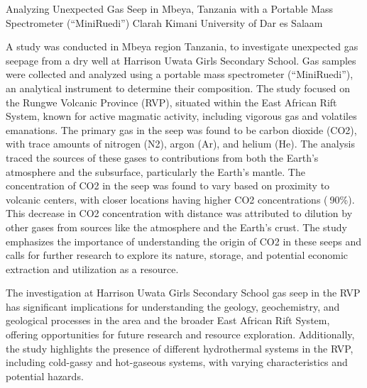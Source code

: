 \begin{conf-abstract}
{Analyzing Unexpected Gas Seep in Mbeya, Tanzania with a Portable Mass Spectrometer (“MiniRuedi”)}
{Clarah Kimani}
{University of Dar es Salaam}
{A study was conducted in Mbeya region Tanzania, to investigate unexpected gas seepage from a dry well at Harrison Uwata Girls Secondary School. Gas samples were collected and analyzed using a portable mass spectrometer (“MiniRuedi”), an analytical instrument to determine their composition. The study focused on the Rungwe Volcanic Province (RVP), situated within the East African Rift System, known for active magmatic activity, including vigorous gas and volatiles emanations. The primary gas in the seep was found to be carbon dioxide (CO2), with trace amounts of nitrogen (N2), argon (Ar), and helium (He). The analysis traced the sources of these gases to contributions from both the Earth's atmosphere and the subsurface, particularly the Earth's mantle.
The concentration of CO2 in the seep was found to vary based on proximity to volcanic centers, with closer locations having higher CO2 concentrations ($~$90\%). This decrease in CO2 concentration with distance was attributed to dilution by other gases from sources like the atmosphere and the Earth's crust. The study emphasizes the importance of understanding the origin of CO2 in these seeps and calls for further research to explore its nature, storage, and potential economic extraction and utilization as a resource.

The investigation at Harrison Uwata Girls Secondary School gas seep in the RVP has significant implications for understanding the geology, geochemistry, and geological processes in the area and the broader East African Rift System, offering opportunities for future research and resource exploration. Additionally, the study highlights the presence of different hydrothermal systems in the RVP, including cold-gassy and hot-gaseous systems, with varying characteristics and potential hazards.}
\end{conf-abstract}
